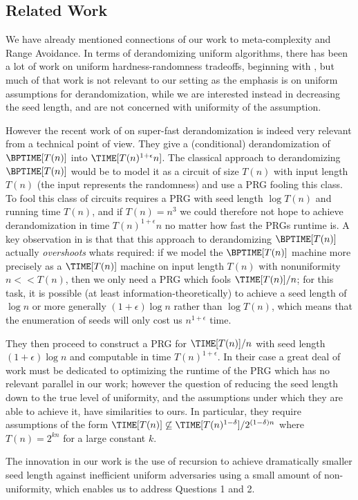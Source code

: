 \subsection{Related Work}

We have already mentioned connections of our work to meta-complexity and Range Avoidance. In terms of derandomizing uniform algorithms, there has been a lot of work on uniform hardness-randomness tradeoffs, beginning with \cite{IW98}, but much of that work is not relevant to our setting as the emphasis is on uniform assumptions for derandomization, while we are interested instead in decreasing the seed length, and are not concerned with uniformity of the assumption. 

However the recent work of \cite{CT21a} on super-fast derandomization is indeed very relevant from a technical point of view.
They give a (conditional) derandomization of $\BPTIME[T(n)]$ into $\TIME[T(n)^{1 + \epsilon} n]$. The classical approach to derandomizing $\BPTIME[T(n)]$ would be to model it as a circuit of size $T(n)$ with input length $T(n)$ (the input represents the randomness) and use a PRG fooling this class. To fool this class of circuits requires a PRG with seed length $\log T(n)$ and running time $T(n)$, and if $T(n) = n^3$ we could therefore not hope to achieve derandomization in time $T(n)^{1+\epsilon} n$ no matter how fast the PRGs runtime is. A key observation in \cite{CT21a} is that that this approach to derandomizing $\BPTIME[T(n)]$ actually \emph{overshoots} whats required: if we model the $\BPTIME[T(n)]$ machine more precisely as a $\TIME[T(n)]$ machine on input length $T(n)$ with nonuniformity $n << T(n)$, then we only need a PRG which fools $\TIME[T(n)]/n$; for this task, it is possible (at least information-theoretically) to achieve a seed length of $\log n$ or more generally $(1 + \epsilon)\log n$ rather than $\log T(n)$, which means that the enumeration of seeds will only cost us $n^{1 + \epsilon}$ time.

They then proceed to construct a PRG for $\TIME[T(n)]/n$ with seed length $(1 + \epsilon) \log n$ and computable in time $T(n)^{1 + \epsilon}$. In their case a great deal of work must be dedicated to optimizing the runtime of the PRG which has no relevant parallel in our work; however the question of reducing the seed length down to the true level of uniformity, and the assumptions under which they are able to achieve it, have similarities to ours. In particular, they require assumptions of the form $\TIME[T(n)] \not\subseteq \TIME[T(n)^{1- \delta}]/2^{(1-\delta)n}$ where $T(n) = 2^{k n}$ for a large constant $k$.

The innovation in our work is the use of recursion to achieve dramatically smaller seed length against inefficient uniform adversaries using a small amount of non-uniformity, which enables us to address Questions 1 and 2.

